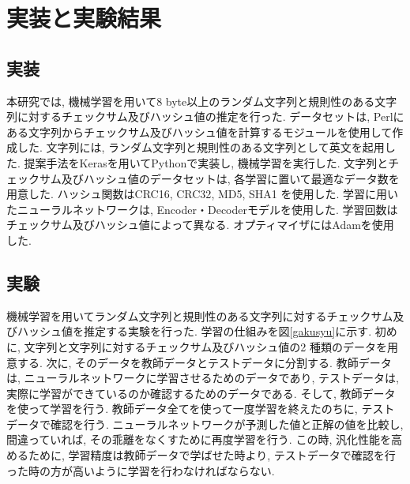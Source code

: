 \documentclass[11pt]{jbook}
\begin{document}
\chapter{実装と実験結果}
\section{実装}

本研究では, 機械学習を用いて8 byte以上のランダム文字列と規則性のある文字列に対するチェックサム及びハッシュ値の推定を行った.
データセットは, Perlにある文字列からチェックサム及びハッシュ値を計算するモジュールを使用して作成した.
文字列には, ランダム文字列と規則性のある文字列として英文を起用した.
提案手法をKerasを用いてPythonで実装し, 機械学習を実行した.
文字列とチェックサム及びハッシュ値のデータセットは, 各学習に置いて最適なデータ数を用意した.
ハッシュ関数はCRC16\cite{crc}, CRC32\cite{crc}, MD5\cite{md5}, SHA1\cite{sha1} を使用した.
学習に用いたニューラルネットワークは, Encoder・Decoderモデルを使用した.
学習回数はチェックサム及びハッシュ値によって異なる.
オプティマイザにはAdamを使用した.


\section{実験}

機械学習を用いてランダム文字列と規則性のある文字列に対するチェックサム及びハッシュ値を推定する実験を行った.
学習の仕組みを図\ref{gakusyu}に示す.
初めに, 文字列と文字列に対するチェックサム及びハッシュ値の2 種類のデータを用意する.
次に, そのデータを教師データとテストデータに分割する.
教師データは, ニューラルネットワークに学習させるためのデータであり, テストデータは, 実際に学習ができているのか確認するためのデータである.
そして, 教師データを使って学習を行う.
教師データ全てを使って一度学習を終えたのちに, テストデータで確認を行う.
ニューラルネットワークが予測した値と正解の値を比較し, 間違っていれば, その乖離をなくすために再度学習を行う.
この時, 汎化性能を高めるために, 学習精度は教師データで学ばせた時より, テストデータで確認を行った時の方が高いように学習を行わなければならない.
\end{document}

